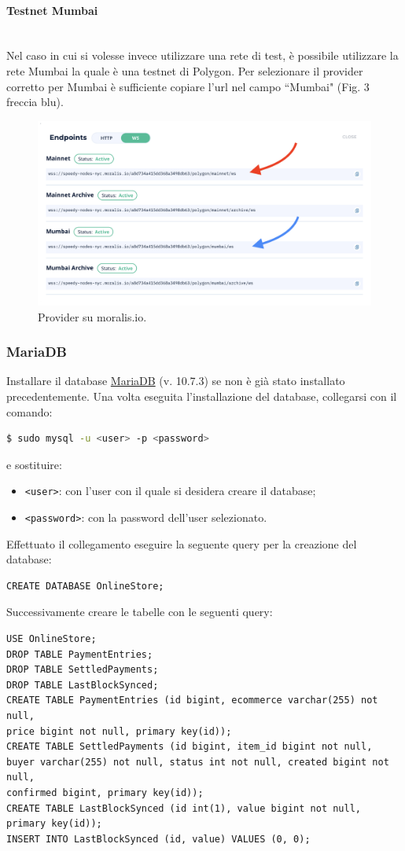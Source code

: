 \documentclass[a4paper, 12pt]{article}
\begin{document}
\paragraph{Testnet Mumbai}\\
Nel caso in cui si volesse invece utilizzare una rete di test, è possibile utilizzare la rete Mumbai la quale è una testnet di Polygon. Per selezionare il provider corretto per Mumbai è sufficiente copiare l'url nel campo ``Mumbai" (Fig. 3 freccia blu).
\FloatBarrier
\begin{figure}[!h]
\centering
\includegraphics[width=0.6\linewidth]{img/moralis.png}
\caption{Provider su moralis.io.}
\end{figure}
\FloatBarrier
\subsubsection{MariaDB}
\label{sec:db}
Installare il database \href{https://mariadb.org/download/}{MariaDB} (v. 10.7.3) se non è già stato installato precedentemente. Una volta eseguita l'installazione del database, collegarsi con il comando:
\begin{lstlisting}[language=bash]
  $ sudo mysql -u <user> -p <password>
\end{lstlisting}
e sostituire:
\begin{itemize}
  \item \verb|<user>|: con l'user con il quale si desidera creare il database;
  \item \verb|<password>|: con la password dell'user selezionato.
\end{itemize}
Effettuato il collegamento eseguire la seguente query per la creazione del database:
\begin{verbatim}
CREATE DATABASE OnlineStore;
\end{verbatim}
Successivamente creare le tabelle con le seguenti query:
\begin{verbatim}
USE OnlineStore;
DROP TABLE PaymentEntries;
DROP TABLE SettledPayments;
DROP TABLE LastBlockSynced;
CREATE TABLE PaymentEntries (id bigint, ecommerce varchar(255) not null,
price bigint not null, primary key(id));
CREATE TABLE SettledPayments (id bigint, item_id bigint not null,
buyer varchar(255) not null, status int not null, created bigint not null,
confirmed bigint, primary key(id));
CREATE TABLE LastBlockSynced (id int(1), value bigint not null, primary key(id));
INSERT INTO LastBlockSynced (id, value) VALUES (0, 0);
\end{verbatim}
\end{document}
